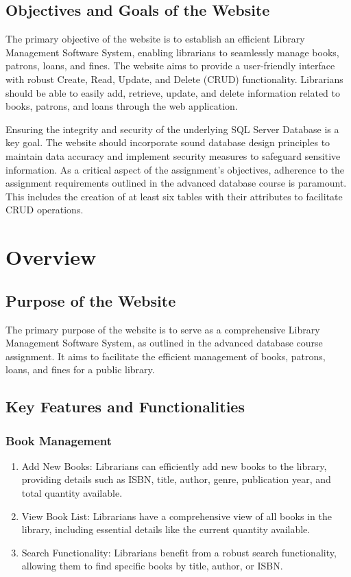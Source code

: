 \documentclass[12pt,titlepage,a4paper]{report}
\begin{document}
\section{Objectives and Goals of the Website}
The primary objective of the website is to establish an efficient Library Management Software System, enabling librarians to seamlessly manage books, patrons, loans, and fines. The website aims to provide a user-friendly interface with robust Create, Read, Update, and Delete (CRUD) functionality. Librarians should be able to easily add, retrieve, update, and delete information related to books, patrons, and loans through the web application.

Ensuring the integrity and security of the underlying SQL Server Database is a key goal. The website should incorporate sound database design principles to maintain data accuracy and implement security measures to safeguard sensitive information. As a critical aspect of the assignment's objectives, adherence to the assignment requirements outlined in the advanced database course is paramount. This includes the creation of at least six tables with their attributes to facilitate CRUD operations.

\chapter{Overview}

\section{Purpose of the Website}
The primary purpose of the website is to serve as a comprehensive Library Management Software System, as outlined in the advanced database course assignment. It aims to facilitate the efficient management of books, patrons, loans, and fines for a public library.

\section{Key Features and Functionalities}

\subsection{Book Management}
\begin{enumerate}
    \item Add New Books: Librarians can efficiently add new books to the library, providing details such as ISBN, title, author, genre, publication year, and total quantity available.
    \item View Book List: Librarians have a comprehensive view of all books in the library, including essential details like the current quantity available.
    \item Search Functionality: Librarians benefit from a robust search functionality, allowing them to find specific books by title, author, or ISBN.
\end{enumerate}
\end{document}
